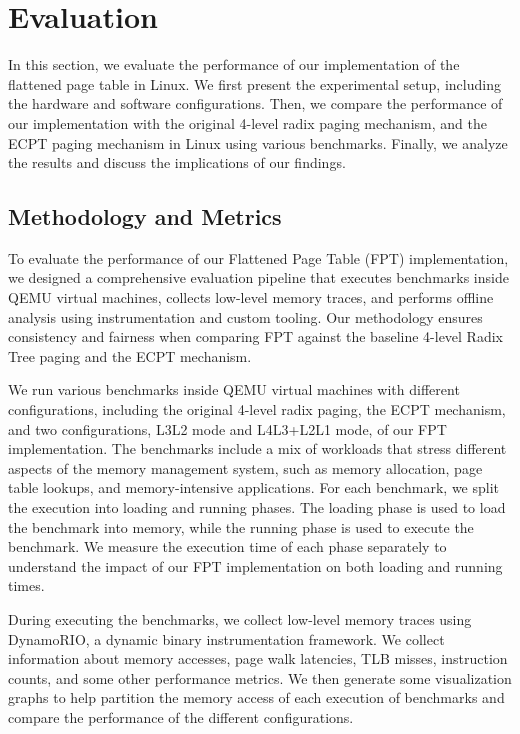 \section{Evaluation}

In this section, we evaluate the performance of our implementation of the flattened page table in Linux. We first present the experimental setup, including the hardware and software configurations. Then, we compare the performance of our implementation with the original 4-level radix paging mechanism, and the ECPT paging mechanism in Linux using various benchmarks. Finally, we analyze the results and discuss the implications of our findings.


\subsection{Methodology and Metrics}

To evaluate the performance of our Flattened Page Table (FPT) implementation, we designed a comprehensive evaluation pipeline that executes benchmarks inside QEMU virtual machines, collects low-level memory traces, and performs offline analysis using instrumentation and custom tooling. Our methodology ensures consistency and fairness when comparing FPT against the baseline 4-level Radix Tree paging and the ECPT mechanism.

We run various benchmarks inside QEMU virtual machines with different configurations, including the original 4-level radix paging, the ECPT mechanism, and two configurations, L3L2 mode and L4L3+L2L1 mode, of our FPT implementation. The benchmarks include a mix of workloads that stress different aspects of the memory management system, such as memory allocation, page table lookups, and memory-intensive applications. For each benchmark, we split the execution into loading and running phases. The loading phase is used to load the benchmark into memory, while the running phase is used to execute the benchmark. We measure the execution time of each phase separately to understand the impact of our FPT implementation on both loading and running times.

During executing the benchmarks, we collect low-level memory traces using DynamoRIO, a dynamic binary instrumentation framework. We collect information about memory accesses, page walk latencies, TLB misses, instruction counts, and some other performance metrics. We then generate some visualization graphs to help partition the memory access of each execution of benchmarks and compare the performance of the different configurations.

